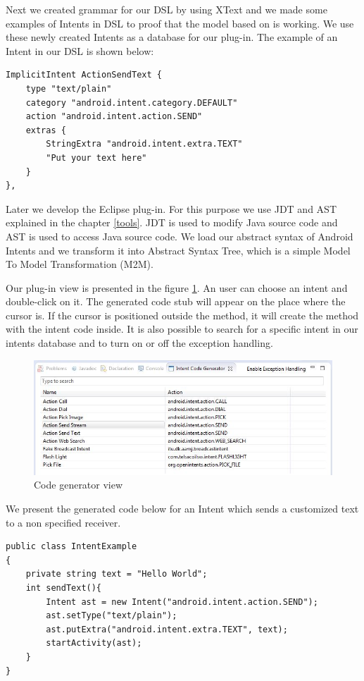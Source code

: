Next we created grammar for our DSL by using XText and we made some examples of Intents in DSL to proof that the model based on is working. We use these newly created Intents as a database for our plug-in. The example of an Intent in our DSL is shown below:

{\footnotesize\begin{lstlisting}
ImplicitIntent ActionSendText {
	type "text/plain"
	category "android.intent.category.DEFAULT"
	action "android.intent.action.SEND"
	extras {
		StringExtra "android.intent.extra.TEXT" 
		"Put your text here"
	}
},
\end{lstlisting}}

Later we develop the Eclipse plug-in. For this purpose we use JDT and AST explained in the chapter \ref{tools}. JDT is used to modify Java source code and AST is used to access Java source code. We load our abstract syntax of Android Intents and we transform it into Abstract Syntax Tree, which is a simple Model To Model Transformation (M2M).

Our plug-in view is presented in the figure \ref{codegeneratorview}. An user can choose an intent and double-click on it. The generated code stub will appear on the place where the cursor is. If the cursor is positioned outside the method, it will create the method with the intent code inside. It is also possible to search for a specific intent in our intents database and to turn on or off the exception handling.

\begin{figure}[H]
\label{codegeneratorview}
  \centering
    \includegraphics[width=\textwidth]{codegenerator}
  \caption{Code generator view}
\end{figure}

We present the generated code below for an Intent which sends a customized text to a non specified receiver.

{\footnotesize\begin{lstlisting}
public class IntentExample
{
	private string text = "Hello World";
	int sendText(){
		Intent ast = new Intent("android.intent.action.SEND");
		ast.setType("text/plain");
		ast.putExtra("android.intent.extra.TEXT", text);
		startActivity(ast);		
	}
}
\end{lstlisting}}